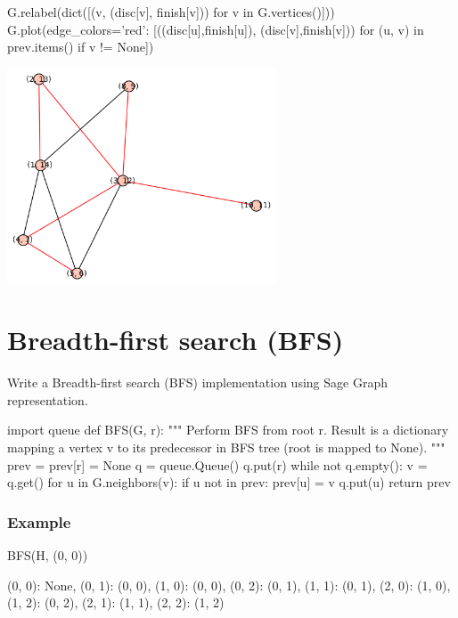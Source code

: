 \begin{sageCell}
    G.relabel(dict([(v, (disc[v], finish[v])) for v in G.vertices()]))
    G.plot(edge_colors={'red': [((disc[u],finish[u]), (disc[v],finish[v]))
      for (u, v) in prev.items() if v != None]})
\end{sageCell}
\begin{outImage}
   \includegraphics[width=0.6\textwidth]{Images/DFS/dfs_tree_with_times.png}
\end{outImage}

\section{Breadth-first search (BFS)}

Write a Breadth-first search (BFS) implementation using Sage Graph representation.

\medskip
\begin{sageCell}
import queue
def BFS(G, r):
    """
    Perform BFS from root r. Result is a dictionary mapping a vertex v
    to its predecessor in BFS tree (root is mapped to None).
    """
    prev = {}
    prev[r] = None
    q = queue.Queue()
    q.put(r)
    while not q.empty():
        v = q.get()
        for u in G.neighbors(v):
            if u not in prev:
                prev[u] = v
                q.put(u)
    return prev
\end{sageCell}

\subsubsection*{Example}

\begin{sageCell}
    BFS(H, (0, 0))
\end{sageCell}
\begin{outCell}
   {(0, 0): None,
    (0, 1): (0, 0),
    (1, 0): (0, 0),
    (0, 2): (0, 1),
    (1, 1): (0, 1),
    (2, 0): (1, 0),
    (1, 2): (0, 2),
    (2, 1): (1, 1),
    (2, 2): (1, 2)}
\end{outCell}

